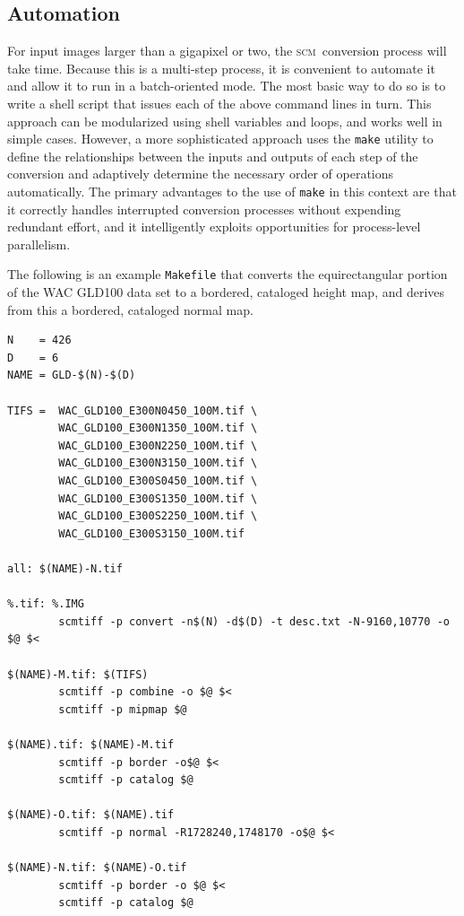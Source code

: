 \documentclass[oneside,10pt]{memoir}
\newcommand{\scm}     {\textsc{scm}}
\begin{document}
\begin{Spacing}{1.1}
\subsection{Automation}

For input images larger than a gigapixel or two, the \scm\ conversion process will take time. Because this is a multi-step process, it is convenient to automate it and allow it to run in a batch-oriented mode. The most basic way to do so is to write a shell script that issues each of the above command lines in turn. This approach can be modularized using shell variables and loops, and works well in simple cases. However, a more sophisticated approach uses the \texttt{make} utility to define the relationships between the inputs and outputs of each step of the conversion and adaptively determine the necessary order of operations automatically. The primary advantages to the use of \texttt{make} in this context are that it correctly handles interrupted conversion processes without expending redundant effort, and it intelligently exploits opportunities for process-level parallelism.

The following is an example \texttt{Makefile} that converts the equirectangular portion of the WAC GLD100 data set to a bordered, cataloged height map, and derives from this a bordered, cataloged normal map.

\begin{Verbatim}
N    = 426
D    = 6
NAME = GLD-$(N)-$(D)

TIFS =  WAC_GLD100_E300N0450_100M.tif \
        WAC_GLD100_E300N1350_100M.tif \
        WAC_GLD100_E300N2250_100M.tif \
        WAC_GLD100_E300N3150_100M.tif \
        WAC_GLD100_E300S0450_100M.tif \
        WAC_GLD100_E300S1350_100M.tif \
        WAC_GLD100_E300S2250_100M.tif \
        WAC_GLD100_E300S3150_100M.tif

all: $(NAME)-N.tif

%.tif: %.IMG
        scmtiff -p convert -n$(N) -d$(D) -t desc.txt -N-9160,10770 -o $@ $<

$(NAME)-M.tif: $(TIFS)
        scmtiff -p combine -o $@ $<
        scmtiff -p mipmap $@

$(NAME).tif: $(NAME)-M.tif
        scmtiff -p border -o$@ $<
        scmtiff -p catalog $@

$(NAME)-O.tif: $(NAME).tif
        scmtiff -p normal -R1728240,1748170 -o$@ $<

$(NAME)-N.tif: $(NAME)-O.tif
        scmtiff -p border -o $@ $<
        scmtiff -p catalog $@
\end{Verbatim}


\end{Spacing}
\end{document}
